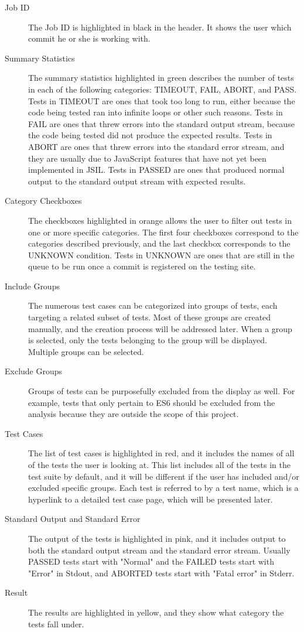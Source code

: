 \documentclass[a4paper,11pt,twoside]{report}
\begin{document}
\begin{description}
\item[Job ID] The Job ID is highlighted in black in the header. It shows the user which commit he or she is working with.

\item[Summary Statistics] The summary statistics highlighted in green describes the number of tests in each of the following categories: TIMEOUT, FAIL, ABORT, and PASS. Tests in TIMEOUT are ones that took too long to run, either because the code being tested ran into infinite loops or other such reasons. Tests in FAIL are ones that threw errors into the standard output stream, because the code being tested did not produce the expected results. Tests in ABORT are ones that threw errors into the standard error stream, and they are usually due to JavaScript features that have not yet been implemented in JSIL. Tests in PASSED are ones that produced normal output to the standard output stream with expected results.

\item[Category Checkboxes] The checkboxes highlighted in orange allows the user to filter out tests in one or more specific categories. The first four checkboxes correspond to the categories described previously, and the last checkbox corresponds to the UNKNOWN condition. Tests in UNKNOWN are ones that are still in the queue to be run once a commit is registered on the testing site.

\item[Include Groups] The numerous test cases can be categorized into groups of tests, each targeting a related subset of tests. Most of these groups are created manually, and the creation process will be addressed later. When a group is selected, only the tests belonging to the group will be displayed. Multiple groups can be selected.

\item[Exclude Groups] Groups of tests can be purposefully excluded from the display as well. For example, tests that only pertain to ES6 should be excluded from the analysis because they are outside the scope of this project.

\item[Test Cases] The list of test cases is highlighted in red, and it includes the names of all of the tests the user is looking at. This list includes all of the tests in the test suite by default, and it will be different if the user has included and/or excluded specific groups. Each test is referred to by a test name, which is a hyperlink to a detailed test case page, which will be presented later.

\item[Standard Output and Standard Error] The output of the tests is highlighted in pink, and it includes output to both the standard output stream and the standard error stream. Usually PASSED tests start with "Normal" and the FAILED tests start with "Error" in Stdout, and ABORTED tests start with "Fatal error" in Stderr.

\item[Result] The results are highlighted in yellow, and they show what category the tests fall under.
\end{description} 
\end{document}
